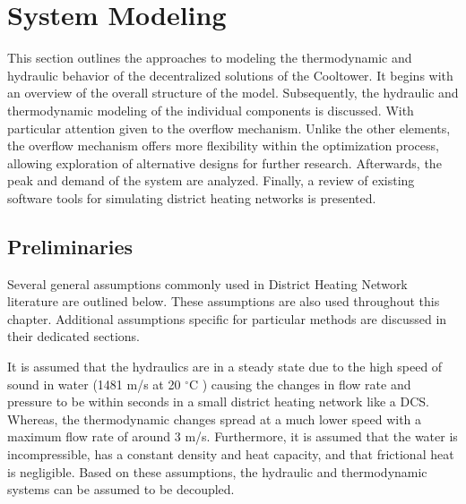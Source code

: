 \chapter{System Modeling}\label{chap::sysmodel}
This section outlines the approaches to modeling the thermodynamic and hydraulic behavior of the decentralized solutions of the Cooltower. It begins with an overview of the overall structure of the model. Subsequently, the hydraulic and thermodynamic modeling of the individual components is discussed. With particular attention given to the overflow mechanism. Unlike the other elements, the overflow mechanism offers more flexibility within the optimization process, allowing exploration of alternative designs for further research. Afterwards, the peak and demand of the system are analyzed. Finally, a review of existing software tools for simulating district heating networks is presented. 

\section{Preliminaries}
Several general assumptions commonly used in District Heating Network literature are outlined below. These assumptions are also used throughout this chapter. Additional assumptions specific for particular methods are discussed in their dedicated sections.

It is assumed that the hydraulics are in a steady state due to the high speed of sound in water (1481 m/s at 20 $^{\circ}\text{C}$ \cite{speedofsound}) causing the changes in flow rate and pressure to be within seconds in a small district heating network like a DCS. Whereas, the thermodynamic changes spread at a much lower speed with a maximum flow rate of around 3 m/s. Furthermore, it is assumed that the water is incompressible, has a constant density and heat capacity, and that frictional heat is negligible. Based on these assumptions, the hydraulic and thermodynamic systems can be assumed to be decoupled.


